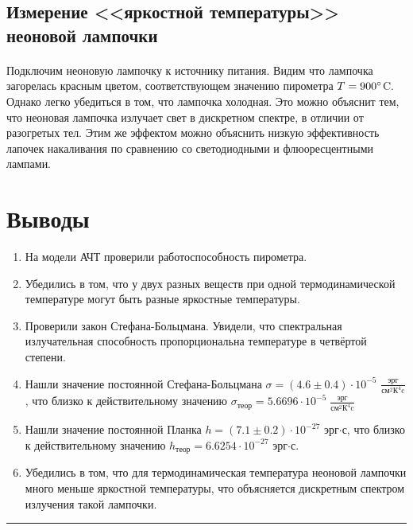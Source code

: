 \documentclass[a4paper,12pt]{article} %
\begin{document}
\subsection{Измерение <<яркостной температуры>> неоновой лампочки}

\paragraph{} Подключим неоновую лампочку к источнику питания. Видим что лампочка загорелась красным цветом, соответствующем значению пирометра $T = 900\degree$C. Однако легко убедиться в том, что лампочка холодная. Это можно объяснит тем, что неоновая лампочка излучает свет в дискретном спектре, в отличии от разогретых тел. Этим же эффектом можно объяснить низкую эффективность лапочек накаливания по сравнению со светодиодными и флюоресцентными лампами.

\section{Выводы}

\begin{enumerate}
\item На модели АЧТ проверили работоспособность пирометра.
\item Убедились в том, что у двух разных веществ при одной термодинамической температуре могут быть разные яркостные температуры.
\item Проверили закон Стефана-Больцмана. Увидели, что спектральная излучательная способность пропорциональна температуре в четвёртой степени.
\item Нашли значение постоянной Стефана-Больцмана $\sigma = (4.6 \pm 0.4) \cdot 10^{-5}$ $\frac{\text{эрг}}{\text{см}^2 \text{К}^4 \text{c}}$, что близко к действительному значению $\sigma_\text{теор} = 5.6696 \cdot 10^{-5} \; \frac{\text{эрг}}{\text{см}^2 \text{К}^4 \text{c}}$
\item Нашли значение постоянной Планка  $h = (7.1 \pm 0.2) \cdot 10^{-27}$ эрг$\cdot$с, что близко к действительному значению  $h_\text{теор} = 6.6254 \cdot 10^{-27}$ эрг$\cdot$с.
\item Убедились в том, что для термодинамическая температура неоновой лампочки много меньше яркостной температуры, что объясняется дискретным спектром излучения такой лампочки.
\end{enumerate}



\medskip\hrule\medskip
\end{document}
